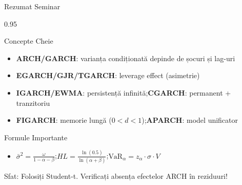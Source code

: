 \documentclass[9pt, aspectratio=169, t]{beamer}
\begin{document}
\begin{frame}{Rezumat Seminar}
    \begin{cminipage}{0.95\textwidth}
    {\footnotesize
    \vspace{-2mm}
    \begin{block}{Concepte Cheie}
        \begin{itemize}\setlength{\itemsep}{-1pt}
            \item \textbf{ARCH/GARCH}: varianța condiționată depinde de șocuri și lag-uri
            \item \textbf{EGARCH/GJR/TGARCH}: leverage effect (asimetrie)
            \item \textbf{IGARCH/EWMA}: persistență infinită;\quad \textbf{CGARCH}: permanent + tranzitoriu
            \item \textbf{FIGARCH}: memorie lungă ($0 < d < 1$);\quad \textbf{APARCH}: model unificator
        \end{itemize}
    \end{block}
    \vspace{-1mm}
    \begin{block}{Formule Importante}
        \begin{itemize}\setlength{\itemsep}{-1pt}
            \item $\bar{\sigma}^2 = \frac{\omega}{1 - \alpha - \beta}$;\quad $HL = \frac{\ln(0.5)}{\ln(\alpha + \beta)}$;\quad $\text{VaR}_\alpha = z_\alpha \cdot \sigma \cdot V$
        \end{itemize}
    \end{block}
    \vspace{-1mm}
    \begin{alertblock}{Sfat: Folosiți Student-t. Verificați absența efectelor ARCH în reziduuri!}
    \end{alertblock}
    }
    \end{cminipage}
\end{frame}
\end{document}
